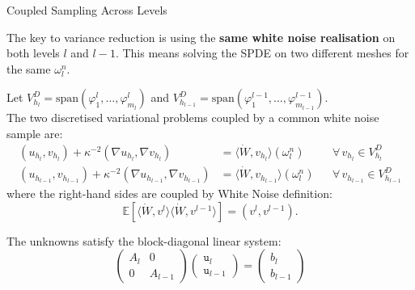 \documentclass[
  english,            %
  aspectratio=169,    %
]{tumbeamer}
\begin{document}
\begin{frame}{Coupled Sampling Across Levels}

The key to variance reduction is using the \textbf{same white noise realisation} on both levels $l$ and $l-1$. This means solving the SPDE on two different meshes for the same \(\omega_l^n\).

\bigskip
Let $V_{h_l}^D = \mathrm{span}(\varphi_1^l,\ldots,\varphi_{m_l}^l)$ and
$V_{h_{l-1}}^D = \mathrm{span}(\varphi_1^{l-1},\ldots,\varphi_{m_{l-1}}^{l-1})$. \\
The two discretised variational problems coupled by a common white noise sample are:
\begin{equation}
  \begin{aligned}
    (u_{h_l}, v_{h_l}) + \kappa^{-2}(\nabla u_{h_l}, \nabla v_{h_l})
      &= \langle\dot{W}, v_{h_l}\rangle(\omega_l^n)
      &&\forall\, v_{h_l} \in V_{h_l}^D \\
    (u_{h_{l-1}}, v_{h_{l-1}}) + \kappa^{-2}(\nabla u_{h_{l-1}}, \nabla v_{h_{l-1}})
      &= \langle\dot{W}, v_{h_{l-1}}\rangle(\omega_l^n)
      &&\forall\, v_{h_{l-1}} \in V_{h_{l-1}}^D
  \end{aligned}
\end{equation}
where the right-hand sides are coupled by White Noise definition: 
\[\mathbb{E}[\langle\dot{W},v^l\rangle\langle\dot{W},v^{l-1}\rangle] = (v^l, v^{l-1}).\]

The unknowns satisfy the block-diagonal linear system:
\begin{equation}
  \begin{pmatrix} A_l & 0 \\ 0 & A_{l-1} \end{pmatrix}
  \begin{pmatrix} \texttt{u}_l \\ \texttt{u}_{l-1} \end{pmatrix}
  =
  \begin{pmatrix} b_l \\ b_{l-1} \end{pmatrix}
\end{equation}

\end{frame}

\end{document}
